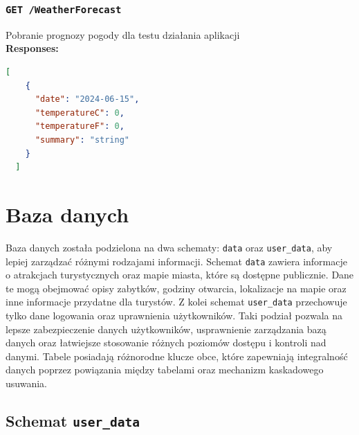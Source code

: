 \subsubsection{\lstinline[language=http]{GET /WeatherForecast}}
Pobranie prognozy pogody dla testu działania aplikacji\\
\textbf{Responses:}
\begin{lstlisting}[language=json]
  [
    {
      "date": "2024-06-15",
      "temperatureC": 0,
      "temperatureF": 0,
      "summary": "string"
    }
  ]
\end{lstlisting}

\section{Baza danych}
Baza danych została podzielona na dwa schematy: \texttt{data} oraz \texttt{user\_data}, aby lepiej zarządzać różnymi rodzajami informacji.
Schemat \texttt{data} zawiera informacje o atrakcjach turystycznych oraz mapie miasta, które są dostępne publicznie.
Dane te mogą obejmować opisy zabytków, godziny otwarcia, lokalizacje na mapie oraz inne informacje przydatne dla turystów.
Z kolei schemat \texttt{user\_data} przechowuje tylko dane logowania oraz uprawnienia użytkowników.
Taki podział pozwala na lepsze zabezpieczenie danych użytkowników, usprawnienie zarządzania bazą danych oraz łatwiejsze stosowanie różnych poziomów dostępu i kontroli nad danymi.
Tabele posiadają różnorodne klucze obce, które zapewniają integralność danych poprzez powiązania między tabelami oraz mechanizm kaskadowego usuwania.

\subsection{Schemat \texttt{user\_data}}

